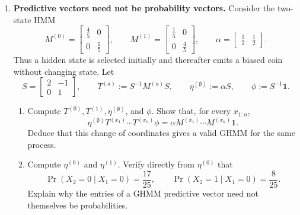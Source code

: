 \begin{exercise}
\begin{enumerate}
\begin{enumerate}
        \item Derive the recursive update and identify its normalising
          factor:
          \[
            \eta^{(x_{1:n}a)}
              =\frac{\eta^{(x_{1:n})}T^{(a)}}
                {\eta^{(x_{1:n})}T^{(a)}\phi},
            \quad
            \Pr(X_{n+1}=a\mid X_{1:n}=x_{1:n})
              =\eta^{(x_{1:n})}T^{(a)}\phi.
          \]

        \item Conceptually contrast an HMM belief state with a GHMM
          predictive vector. Compare the meaning of their coordinates, their
          positivity and normalisation properties, and how they encode
          predictions of future observations.
      \end{enumerate}

    \item \textbf{Predictive vectors need not be probability vectors.}
      Consider the two-state HMM
      \[
        M^{(0)}=
          \begin{bmatrix}\tfrac45&0\\0&\tfrac15\end{bmatrix},
        \qquad
        M^{(1)}=
          \begin{bmatrix}\tfrac15&0\\0&\tfrac45\end{bmatrix},
        \qquad
        \alpha=\begin{bmatrix}\tfrac12&\tfrac12\end{bmatrix}.
      \]
      Thus a hidden state is selected initially and thereafter emits a biased
      coin without changing state. Let
      \[
        S=\begin{bmatrix}2&-1\\0&1\end{bmatrix},
        \qquad
        T^{(a)}:=S^{-1}M^{(a)}S,\qquad
        \eta^{(\emptyset)}:=\alpha S,\qquad
        \phi:=S^{-1}\mathbf 1.
      \]
      \begin{enumerate}
        \item Compute $T^{(0)},T^{(1)},\eta^{(\emptyset)}$, and $\phi$.
          Show that, for every $x_{1:n}$,
          \[
            \eta^{(\emptyset)}
              T^{(x_1)}\cdots T^{(x_n)}\phi
              =
            \alpha M^{(x_1)}\cdots M^{(x_n)}\mathbf 1.
          \]
          Deduce that this change of coordinates gives a valid GHMM for the
          same process.

        \item Compute $\eta^{(0)}$ and $\eta^{(1)}$. Verify directly from
          $\eta^{(0)}$ that
          \[
            \Pr(X_2=0\mid X_1=0)=\frac{17}{25},
            \qquad
            \Pr(X_2=1\mid X_1=0)=\frac8{25}.
          \]
          Explain why the entries of a GHMM predictive vector need not
          themselves be probabilities.
      \end{enumerate}


\end{enumerate}
\end{exercise}
